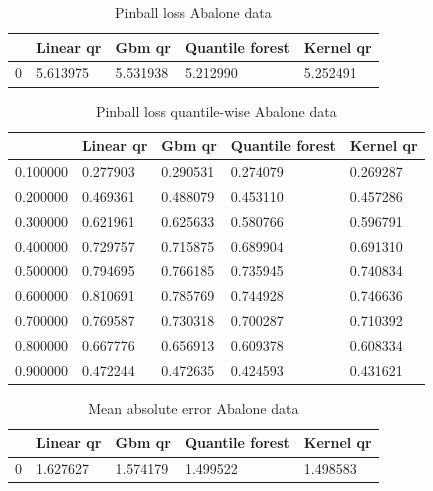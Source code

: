 \begin{table}
    \caption{Pinball loss Abalone data}
\begin{tabular}{lllll}
    \toprule
     & Linear qr & Gbm qr & Quantile forest & Kernel qr \\
    \midrule
    0 & 5.613975 & 5.531938 & 5.212990 & 5.252491 \\
    \bottomrule
    \end{tabular}
\end{table}
    
\begin{table}
    \caption{Pinball loss quantile-wise Abalone data}
    \begin{tabular}{lllll}
    \toprule
     & Linear qr & Gbm qr & Quantile forest & Kernel qr \\
    \midrule
    0.100000 & 0.277903 & 0.290531 & 0.274079 & 0.269287 \\
    0.200000 & 0.469361 & 0.488079 & 0.453110 & 0.457286 \\
    0.300000 & 0.621961 & 0.625633 & 0.580766 & 0.596791 \\
    0.400000 & 0.729757 & 0.715875 & 0.689904 & 0.691310 \\
    0.500000 & 0.794695 & 0.766185 & 0.735945 & 0.740834 \\
    0.600000 & 0.810691 & 0.785769 & 0.744928 & 0.746636 \\
    0.700000 & 0.769587 & 0.730318 & 0.700287 & 0.710392 \\
    0.800000 & 0.667776 & 0.656913 & 0.609378 & 0.608334 \\
    0.900000 & 0.472244 & 0.472635 & 0.424593 & 0.431621 \\
    \bottomrule
    \end{tabular}
\end{table}
    
\begin{table}
    \caption{Mean absolute error Abalone data}
    \begin{tabular}{lllll}
    \toprule
     & Linear qr & Gbm qr & Quantile forest & Kernel qr \\
    \midrule
    0 & 1.627627 & 1.574179 & 1.499522 & 1.498583 \\
    \bottomrule
    \end{tabular}
\end{table} 

